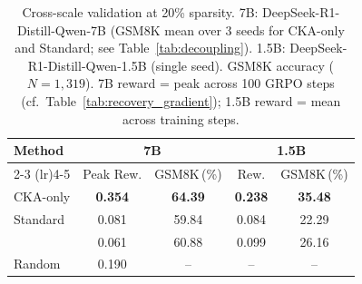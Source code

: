 \begin{table}[t]
\centering
\small
\caption{Cross-scale validation at 20\% sparsity. 7B: DeepSeek-R1-Distill-Qwen-7B (GSM8K mean over 3 seeds for CKA-only and Standard; see Table~\ref{tab:decoupling}). 1.5B: DeepSeek-R1-Distill-Qwen-1.5B (single seed). GSM8K accuracy ($N{=}1{,}319$). 7B reward = peak across 100 GRPO steps (cf.\ Table~\ref{tab:recovery_gradient}); 1.5B reward = mean across training steps.}
\label{tab:cross_scale}
\begin{tabular}{@{}lcccc@{}}
\toprule
\multirow{2}{*}{Method} & \multicolumn{2}{c}{7B} & \multicolumn{2}{c}{1.5B} \\
\cmidrule(lr){2-3} \cmidrule(lr){4-5}
 & Peak Rew. & GSM8K\,(\%) & Rew. & GSM8K\,(\%) \\
\midrule
CKA-only & \textbf{0.354} & \textbf{64.39} & \textbf{0.238} & \textbf{35.48} \\
Standard & 0.081 & 59.84 & 0.084 & 22.29 \\
\rasp{} & 0.061 & 60.88 & 0.099 & 26.16 \\
Random & 0.190 & -- & -- & -- \\
\bottomrule
\end{tabular}
\end{table}
